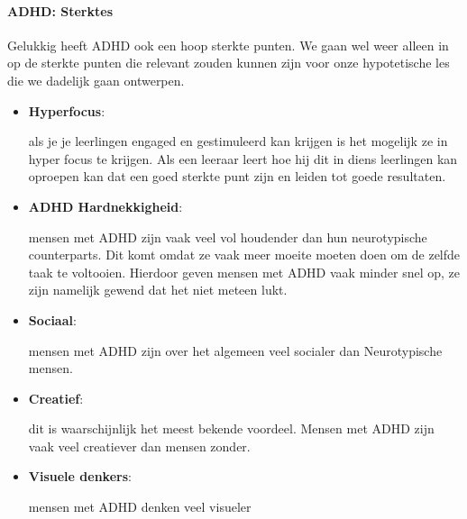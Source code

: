 \documentclass{article}
\begin{document}
                \bigskip\noindent\paragraph{ADHD: Sterktes}

                    Gelukkig heeft ADHD ook een hoop sterkte punten. We gaan wel weer alleen in op de sterkte punten die relevant zouden kunnen zijn voor onze hypotetische les die we dadelijk gaan ontwerpen.

                    \begin{itemize}

                        \item \textbf{Hyperfocus}:
                        
                            als je je leerlingen engaged en gestimuleerd kan krijgen is het mogelijk ze in hyper focus te krijgen. Als een leeraar leert hoe hij dit in diens leerlingen kan oproepen kan dat een goed sterkte punt zijn en leiden tot goede resultaten.

                        \item \textbf{ADHD Hardnekkigheid}:

                            mensen met ADHD zijn vaak veel vol houdender dan hun neurotypische counterparts. Dit komt omdat ze vaak meer moeite moeten doen om de zelfde taak te voltooien. Hierdoor geven mensen met ADHD vaak minder snel op, ze zijn namelijk gewend dat het niet meteen lukt.\cite{ADHD-resilience}
                        
                        \item \textbf{Sociaal}: 

                            mensen met ADHD zijn over het algemeen veel socialer dan Neurotypische mensen. 
                        
                        \item \textbf{Creatief}: 

                            dit is waarschijnlijk het meest bekende voordeel. Mensen met ADHD zijn vaak veel creatiever dan mensen zonder.\cite{ADHD-creativity}
                        
                        \item \textbf{Visuele denkers}: 
                            
                            mensen met ADHD denken veel visueler

                    \end{itemize}
                
\end{document}
